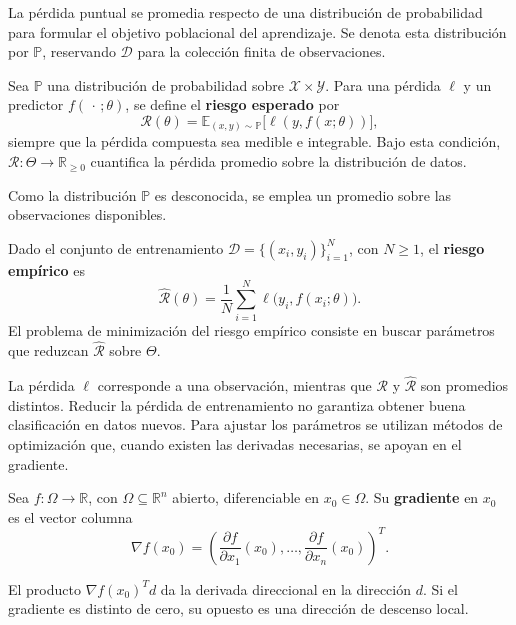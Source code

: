 La pérdida puntual se promedia respecto de una distribución de probabilidad para formular el objetivo poblacional del aprendizaje. Se denota esta distribución por $\mathbb P$, reservando $\mathcal D$ para la colección finita de observaciones.

\begin{definition}
\label{def:riesgo-esperado}
Sea $\mathbb P$ una distribución de probabilidad sobre $\mathcal X\times\mathcal Y$. Para una pérdida $\ell$ y un predictor $f(\,\cdot\,;\theta)$, se define el \textbf{riesgo esperado} por
\[
\mathcal R(\theta)=\mathbb E_{(x,y)\sim\mathbb P}\bigl[\ell(y,f(x;\theta))\bigr],
\]
siempre que la pérdida compuesta sea medible e integrable. Bajo esta condición, $\mathcal R:\Theta\to\mathbb R_{\geq0}$ cuantifica la pérdida promedio sobre la distribución de datos.
\end{definition}

Como la distribución $\mathbb P$ es desconocida, se emplea un promedio sobre las observaciones disponibles.

\begin{definition}
\label{def:riesgo-empirico}
Dado el conjunto de entrenamiento $\mathcal D=\{(x_i,y_i)\}_{i=1}^{N}$, con $N\geq1$, el \textbf{riesgo empírico} es
\[
\widehat{\mathcal R}(\theta)=\frac1N\sum_{i=1}^{N}\ell\bigl(y_i,f(x_i;\theta)\bigr).
\]
El problema de minimización del riesgo empírico consiste en buscar parámetros que reduzcan $\widehat{\mathcal R}$ sobre $\Theta$.
\end{definition}


La pérdida $\ell$ corresponde a una observación, mientras que $\mathcal R$ y $\widehat{\mathcal R}$ son promedios distintos. Reducir la pérdida de entrenamiento no garantiza obtener buena clasificación en datos nuevos. Para ajustar los parámetros se utilizan métodos de optimización que, cuando existen las derivadas necesarias, se apoyan en el gradiente.

\begin{definition}[Gradiente]
\label{def:gradiente}
Sea $f:\Omega\to\mathbb R$, con $\Omega\subseteq\mathbb R^n$ abierto, diferenciable en $x_0\in\Omega$. Su \textbf{gradiente} en $x_0$ es el vector columna
\[
\nabla f(x_0)=\left(\frac{\partial f}{\partial x_1}(x_0),\ldots,\frac{\partial f}{\partial x_n}(x_0)\right)^T.
\]
\end{definition}
El producto $\nabla f(x_0)^T d$ da la derivada direccional en la dirección $d$. Si el gradiente es distinto de cero, su opuesto es una dirección de descenso local.

